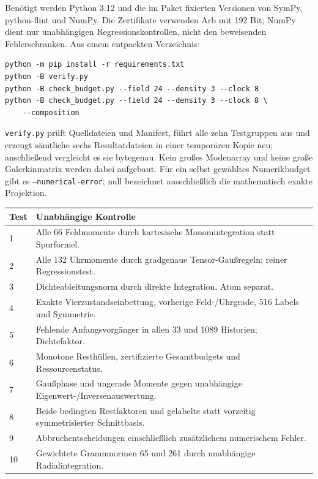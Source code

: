 \documentclass[10pt,a4paper]{article}
\begin{document}
Benötigt werden Python 3.12 und die im Paket fixierten Versionen von
SymPy, python-flint und NumPy. Die Zertifikate verwenden Arb mit 192 Bit;
NumPy dient nur unabhängigen Regressionskontrollen, nicht den beweisenden
Fehlerschranken. Aus einem entpackten Verzeichnis:
\begin{verbatim}
python -m pip install -r requirements.txt
python -B verify.py
python -B check_budget.py --field 24 --density 3 --clock 8
python -B check_budget.py --field 24 --density 3 --clock 8 \
    --composition
\end{verbatim}
\texttt{verify.py} prüft Quelldateien und Manifest, führt alle zehn Testgruppen
aus und erzeugt sämtliche sechs Resultatdateien in einer temporären Kopie
neu; anschließend vergleicht es sie bytegenau. Kein großes Modenarray und
keine große Galerkinmatrix werden dabei aufgebaut. Für ein selbst gewähltes
Numerikbudget gibt es \texttt{--numerical-error}; null bezeichnet ausschließlich
die mathematisch exakte Projektion.

\begin{center}\begin{tabular}{p{.09\linewidth}p{.81\linewidth}}\toprule
Test & Unabhängige Kontrolle\\\midrule
1 & Alle 66 Feldmomente durch kartesische Monomintegration statt Spurformel.\\
2 & Alle 132 Uhrmomente durch gradgenaue Tensor-Gaußregeln; reiner Regressionstest.\\
3 & Dichteableitungsnorm durch direkte Integration, Atom separat.\\
4 & Exakte Vierzustandseinbettung, vorherige Feld-/Uhrgrade, 516 Labels und Symmetrie.\\
5 & Fehlende Anfangsvorgänger in allen 33 und 1089 Historien; Dichtefaktor.\\
6 & Monotone Resthüllen, zertifizierte Gesamtbudgets und Ressourcenstatus.\\
7 & Gaußphase und ungerade Momente gegen unabhängige Eigenwert-/Inversenauswertung.\\
8 & Beide bedingten Restfaktoren und gelabelte statt vorzeitig symmetrisierter Schnittbasis.\\
9 & Abbruchentscheidungen einschließlich zusätzlichem numerischem Fehler.\\
10 & Gewichtete Grammnormen 65 und 261 durch unabhängige Radialintegration.\\\bottomrule
\end{tabular}\end{center}
\end{document}
